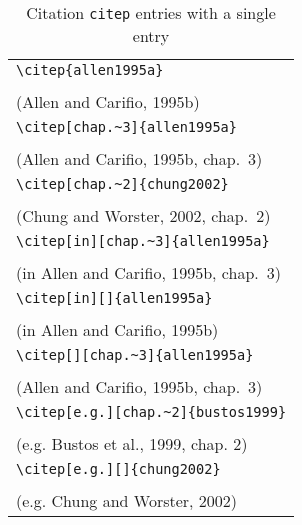\documentclass{article}
\begin{document}
\begin{table}
\begin{center}
\begin{tabular}{l}
	\verb#\citep{allen1995a}# \\
	\citep{allen1995a} \\
	(Allen and Carifio, 1995b)\\
\hline
	\verb#\citep[chap.~3]{allen1995a}# \\
	\citep[chap.~3]{allen1995a} \\
	(Allen and Carifio, 1995b, chap.~3)\\
\hline 
	\verb#\citep[chap.~2]{chung2002}#\\
	\citep[chap.~2]{chung2002} \\
	(Chung and Worster, 2002, chap.~2)\\
\hline
	\verb#\citep[in][chap.~3]{allen1995a}# \\
	\citep[in][chap.~3]{allen1995a} \\
	(in Allen and Carifio, 1995b, chap.~3)\\
\hline
	\verb#\citep[in][]{allen1995a}# \\
	\citep[in][]{allen1995a} \\
	(in Allen and Carifio, 1995b)\\
\hline
	\verb#\citep[][chap.~3]{allen1995a}# \\
	\citep[][chap.~3]{allen1995a} \\
	(Allen and Carifio, 1995b, chap.~3)\\
\hline
	\verb#\citep[e.g.][chap.~2]{bustos1999}#\\
	\citep[e.g.][chap.~2]{bustos1999} \\
	(e.g. Bustos et al., 1999, chap. 2)\\
\hline 
	\verb#\citep[e.g.][]{chung2002}#\\
	\citep[e.g.][]{chung2002} \\
	(e.g. Chung and Worster, 2002)\\
\end{tabular}
\end{center}
\caption{Citation \texttt{citep} entries with a single entry}
\end{table}
\end{document}
